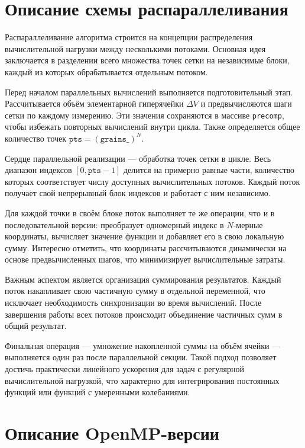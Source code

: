 \documentclass[12pt,a4paper]{extarticle}
\begin{document}
\newpage
\section{Описание схемы распараллеливания}

Распараллеливание алгоритма строится на концепции распределения вычислительной нагрузки между несколькими потоками. Основная идея заключается в разделении всего множества точек сетки на независимые блоки, каждый из которых обрабатывается отдельным потоком. 

Перед началом параллельных вычислений выполняется подготовительный этап. Рассчитывается объём элементарной гиперячейки $\Delta V$ и предвычисляются шаги сетки по каждому измерению. Эти значения сохраняются в массиве \texttt{precomp}, чтобы избежать повторных вычислений внутри цикла. Также определяется общее количество точек $\texttt{pts} = (\texttt{grains\_})^N$.

Сердце параллельной реализации — обработка точек сетки в цикле. Весь диапазон индексов $[0, \texttt{pts}-1]$ делится на примерно равные части, количество которых соответствует числу доступных вычислительных потоков. Каждый поток получает свой непрерывный блок индексов и работает с ним независимо. 

Для каждой точки в своём блоке поток выполняет те же операции, что и в последовательной версии: преобразует одномерный индекс в $N$-мерные координаты, вычисляет значение функции и добавляет его в свою локальную сумму. Интересно отметить, что координаты рассчитываются динамически на основе предвычисленных шагов, что минимизирует вычислительные затраты.

Важным аспектом является организация суммирования результатов. Каждый поток накапливает свою частичную сумму в отдельной переменной, что исключает необходимость синхронизации во время вычислений. После завершения работы всех потоков происходит объединение частичных сумм в общий результат. 

Финальная операция — умножение накопленной суммы на объём ячейки — выполняется один раз после параллельной секции. Такой подход позволяет достичь практически линейного ускорения для задач с регулярной вычислительной нагрузкой, что характерно для интегрирования постоянных функций или функций с умеренными колебаниями.

\newpage
\section{Описание OpenMP-версии}
\end{document}
